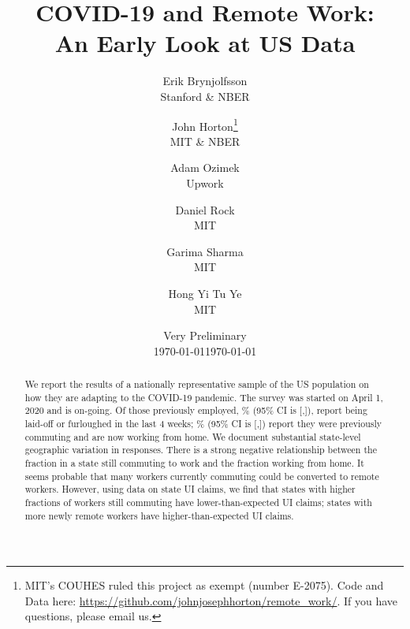 \documentclass[12pt]{article}
\newcommand{\covid}{COVID-19}
\begin{document}
 

\title{COVID-19 and Remote Work:\\ An Early Look at US Data}

\date{Very Preliminary \\ \today}

\date{\today}

\author{Erik Brynjolfsson\\Stanford \& NBER \and John Horton\footnote{
    MIT's COUHES ruled this project as exempt (number E-2075).
    Code and Data here: \href{https://github.com/johnjosephhorton/remote_work/}{https://github.com/johnjosephhorton/remote\_work/}.
    If you have questions, please email us.
  }\\MIT \& NBER \and Adam Ozimek\\Upwork \and Daniel Rock\\MIT \and Garima Sharma\\MIT \and Hong Yi Tu Ye\\MIT}


\maketitle

\begin{abstract}
  \noindent 
  We report the results of a nationally representative sample of the US population on how they are adapting to the \covid{} pandemic.
  The survey was started on April 1, 2020 and is on-going.
  Of those previously employed, \LaidOff{}\% (95\% CI is [\LaidOffLB,\LaidOffUB]), report being laid-off or furloughed in the last 4 weeks;
  \WFH{}\% (95\% CI is [\WFHLB,\WFHUB]) report they were previously commuting and are now working from home.
  We document substantial state-level geographic variation in responses.
  There is a strong negative relationship between the fraction in a state still commuting to work and the fraction working from home. 
  It seems probable that many workers currently commuting could be converted to remote workers. 
  However, using data on state UI claims, we find that states with higher fractions of workers still commuting have lower-than-expected UI claims; states with more newly remote workers have higher-than-expected UI claims.
  \newline 
\end{abstract} 
\end{document}
